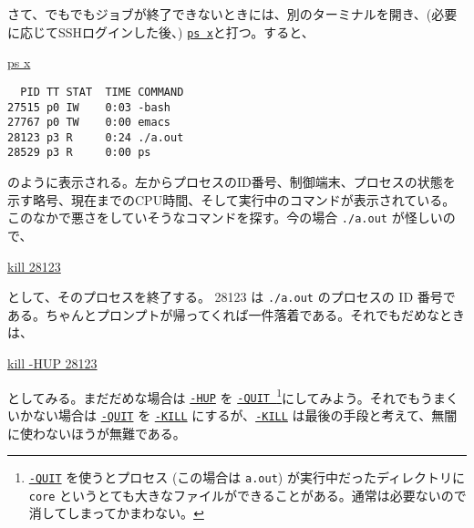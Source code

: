 さて、でもでもジョブが終了できないときには、別のターミナルを開き、(必要に応じてSSHログインした後、) \underline{\tt ps x}と打つ。すると、
\begin{commandline2}
\prompt \underline{ps x}
\begin{verbatim}
  PID TT STAT  TIME COMMAND
27515 p0 IW    0:03 -bash
27767 p0 TW    0:00 emacs
28123 p3 R     0:24 ./a.out
28529 p3 R     0:00 ps
\end{verbatim}
\end{commandline2} \noindent
のように表示される。左からプロセスのID番号、制御端末、プロセスの状態を示す略号、現在までのCPU時間、そして実行中のコマンドが表示されている。このなかで悪さをしていそうなコマンドを探す。今の場合 {\tt ./a.out} が怪しいので、
\begin{commandline2}
\prompt \underline{kill 28123}
\end{commandline2} \noindent
として、そのプロセスを終了する。 28123 は {\tt ./a.out} のプロセスの ID 番号である。ちゃんとプロンプトが帰ってくれば一件落着である。それでもだめなときは、
\begin{commandline2}
\prompt \underline{kill -HUP 28123}
\end{commandline2} \noindent
としてみる。まだだめな場合は \underline{\tt -HUP} を \underline{\tt -QUIT }\footnote{\underline{\tt -QUIT} を使うとプロセス (この場合は {\tt a.out}) が実行中だったディレクトリに{\tt core} というとても大きなファイルができることがある。通常は必要ないので消してしまってかまわない。}にしてみよう。それでもうまくいかない場合は \underline{\tt -QUIT} を \underline{\tt -KILL} にするが、\underline{\tt -KILL} は最後の手段と考えて、無闇に使わないほうが無難である。



